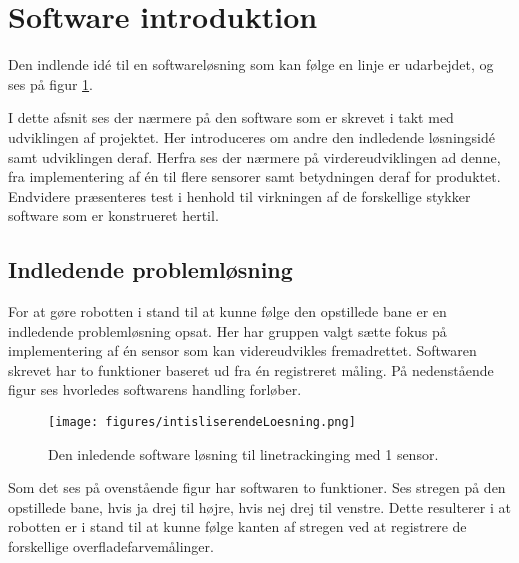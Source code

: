 \section{Software introduktion}
Den indlende idé til en softwareløsning som kan følge en linje er udarbejdet, og ses på figur \ref{init_software}.

I dette afsnit ses der nærmere på den software som er skrevet i takt med udviklingen af projektet. Her introduceres om andre den indledende løsningsidé samt udviklingen deraf. Herfra ses der nærmere på virdereudviklingen ad denne, fra implementering af én til flere sensorer samt betydningen deraf for produktet.
\newline 
Endvidere præsenteres test i henhold til virkningen af de forskellige stykker software som er konstrueret hertil. 

\subsection{Indledende problemløsning}
For at gøre robotten i stand til at kunne følge den opstillede bane er en indledende problemløsning opsat. Her har gruppen valgt sætte fokus på implementering af én sensor som kan videreudvikles fremadrettet. 
\newline 
Softwaren skrevet har to funktioner baseret ud fra én registreret måling. På nedenstående figur ses hvorledes softwarens handling forløber.

\begin{figure}[h!]
  \centering
  \texttt{[image: figures/intisliserendeLoesning.png]}
  \caption{Den inledende software løsning til linetrackinging med 1 sensor.}
  \label{init_software}
\end{figure}

Som det ses på ovenstående figur har softwaren to funktioner. Ses stregen på den opstillede bane, hvis ja drej til højre, hvis nej drej til venstre. Dette resulterer i at robotten er i stand til at kunne følge kanten af stregen ved at registrere de forskellige overfladefarvemålinger.   


